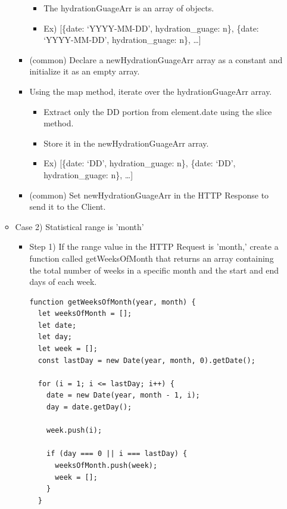 \documentclass[conference]{IEEEtran}
\begin{document}
\begin{itemize}
\begin{itemize}
\begin{itemize}
            \begin{itemize}
                \item The hydrationGuageArr is an array of objects.
                \item Ex) [\{date: ‘YYYY-MM-DD’, hydration\_guage: n\}, \{date: ‘YYYY-MM-DD’, hydration\_guage: n\}, …]
            \end{itemize}
            \item (common) Declare a newHydrationGuageArr array as a constant and initialize it as an empty array.
            \item Using the map method, iterate over the hydrationGuageArr array.
            \begin{itemize}
                \item Extract only the DD portion from element.date using the slice method.
                \item Store it in the newHydrationGuageArr array.
                \item Ex) [\{date: ‘DD’, hydration\_guage: n\}, \{date: ‘DD’, hydration\_guage: n\}, …]
            \end{itemize}
            \item (common) Set newHydrationGuageArr in the HTTP Response to send it to the Client.
            \\
        \end{itemize}
        \item Case 2) Statistical range is 'month' 
        \begin{itemize}
            \item Step 1) If the range value in the HTTP Request is 'month,' create a function called getWeeksOfMonth that returns an array containing the total number of weeks in a specific month and the start and end days of each week. 
            \begin{lstlisting}[style=htmlcssjs]
function getWeeksOfMonth(year, month) {
  let weeksOfMonth = [];
  let date;
  let day;
  let week = [];
  const lastDay = new Date(year, month, 0).getDate();

  for (i = 1; i <= lastDay; i++) {
    date = new Date(year, month - 1, i);
    day = date.getDay();

    week.push(i);

    if (day === 0 || i === lastDay) {
      weeksOfMonth.push(week);
      week = [];
    }
  }


\end{lstlisting}
\end{itemize}
\end{itemize}
\end{itemize}
\end{document}
